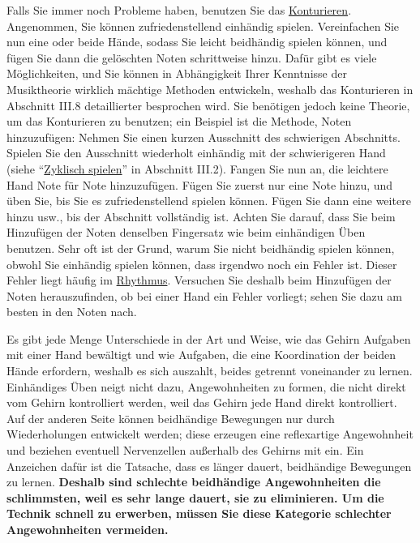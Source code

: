 Falls Sie immer noch Probleme haben, benutzen Sie das \hyperref[c1iii8]{Konturieren}.
Angenommen, Sie können zufriedenstellend einhändig spielen.
Vereinfachen Sie nun eine oder beide Hände, sodass Sie leicht beidhändig spielen können, und fügen Sie dann die gelöschten Noten schrittweise hinzu.
Dafür gibt es viele Möglichkeiten, und Sie können in Abhängigkeit Ihrer Kenntnisse der Musiktheorie wirklich mächtige Methoden entwickeln, weshalb das Konturieren in Abschnitt III.8 detaillierter besprochen wird.
Sie benötigen jedoch keine Theorie, um das Konturieren zu benutzen; ein Beispiel ist die Methode, Noten hinzuzufügen: Nehmen Sie einen kurzen Ausschnitt des schwierigen Abschnitts.
Spielen Sie den Ausschnitt wiederholt einhändig mit der schwierigeren Hand (siehe \enquote{\hyperref[c1iii2]{Zyklisch spielen}} in Abschnitt III.2).
Fangen Sie nun an, die leichtere Hand Note für Note hinzuzufügen.
Fügen Sie zuerst nur eine Note hinzu, und üben Sie, bis Sie es zufriedenstellend spielen können.
Fügen Sie dann eine weitere hinzu usw., bis der Abschnitt vollständig ist.
Achten Sie darauf, dass Sie beim Hinzufügen der Noten denselben Fingersatz wie beim einhändigen Üben benutzen.
Sehr oft ist der Grund, warum Sie nicht beidhändig spielen können, obwohl Sie einhändig spielen können, dass irgendwo noch ein Fehler ist.
Dieser Fehler liegt häufig im \hyperref[c1iii1b]{Rhythmus}.
Versuchen Sie deshalb beim Hinzufügen der Noten herauszufinden, ob bei einer Hand ein Fehler vorliegt;
sehen Sie dazu am besten in den Noten nach.

Es gibt jede Menge Unterschiede in der Art und Weise, wie das Gehirn Aufgaben mit einer Hand bewältigt und wie Aufgaben, die eine Koordination der beiden Hände erfordern, weshalb es sich auszahlt, beides getrennt voneinander zu lernen.
Einhändiges Üben neigt nicht dazu, Angewohnheiten zu formen, die nicht direkt vom Gehirn kontrolliert werden, weil das Gehirn jede Hand direkt kontrolliert.
Auf der anderen Seite können beidhändige Bewegungen nur durch Wiederholungen entwickelt werden; diese erzeugen eine reflexartige Angewohnheit und beziehen eventuell Nervenzellen außerhalb des Gehirns mit ein.
Ein Anzeichen dafür ist die Tatsache, dass es länger dauert, beidhändige Bewegungen zu lernen.
\textbf{Deshalb sind schlechte beidhändige Angewohnheiten die schlimmsten, weil es sehr lange dauert, sie zu eliminieren.
Um die Technik schnell zu erwerben, müssen Sie diese Kategorie schlechter Angewohnheiten vermeiden.}

